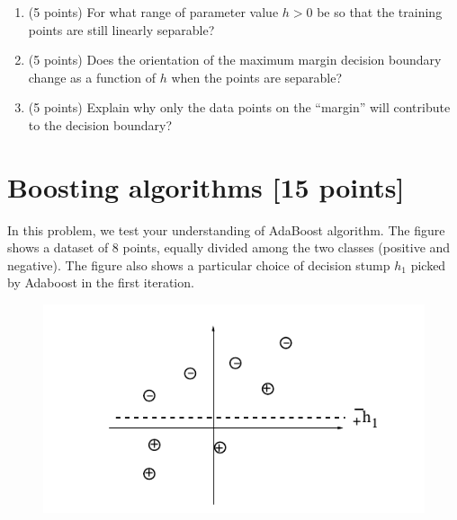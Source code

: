 \documentclass[a4paper,12pt,fleqn]{article}
\begin{document}
\begin{enumerate}
\item (5 points) For what range of parameter value $h > 0$ be so that the training points are still linearly separable?

\vspace{1in}

\item (5 points) Does the orientation of the maximum margin decision boundary change as a function of $h$ when the points are separable?

\vspace{1.5in}

\item (5 points) Explain why only the data points on the ``margin'' will contribute to the decision boundary?
\end{enumerate}



\clearpage

\section{Boosting algorithms [15 points]}
In this problem, we test your understanding of AdaBoost algorithm. The figure shows a dataset of 8 points, equally divided among the two classes (positive and negative). The figure also shows a particular choice of decision stump $h_1$ picked by Adaboost in the first iteration. 

\begin{figure}[ht]%
  \begin{center}
    \includegraphics[width=0.7\columnwidth, trim = 0 100 0 0]{./fig/adaboost.png}
  \end{center}
\end{figure}

\vspace{2cm}
\end{document}
